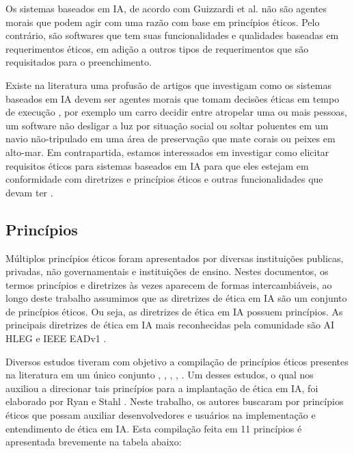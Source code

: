 Os sistemas baseados em \acrshort{IA}, de acordo com Guizzardi et al. \cite{guizzardi2020ethical} não são agentes morais que podem agir com uma razão com base em princípios éticos. Pelo contrário, são softwares que tem suas funcionalidades e qualidades baseadas em requerimentos éticos, em adição a outros tipos de requerimentos que são requisitados para o preenchimento.

Existe na literatura uma profusão de artigos que investigam como os sistemas baseados em IA devem ser agentes morais que tomam decisões éticas em tempo de execução \cite{guizzardi2020ethical}, por exemplo um carro decidir entre atropelar uma ou mais pessoas, um software não desligar a luz por situação social ou soltar poluentes em um navio não-tripulado em uma área de preservação que mate corais ou peixes em alto-mar. Em contrapartida, estamos interessados em investigar como elicitar requisitos éticos para sistemas baseados em IA para que eles estejam em conformidade com diretrizes e princípios éticos e outras funcionalidades que devam ter \cite{guizzardi2020ethical}.
 
\subsection{Princípios}

Múltiplos princípios éticos foram apresentados por diversas instituições publicas, privadas, não governamentais e instituições de ensino. Nestes documentos, os termos princípios e diretrizes às vezes aparecem de formas intercambiáveis, ao longo deste trabalho assumimos que as diretrizes de ética em IA são um conjunto de princípios éticos. Ou seja, as diretrizes de ética em IA possuem princípios. As principais diretrizes de ética em IA mais reconhecidas pela comunidade são \acrshort{AI HLEG}\cite{HLEG_EthicsGuidelinesForTrustworthyAI} e \acrshort{IEEE} \acrshort{EAD}v1 \cite{ieee2020EADv1}.

Diversos estudos tiveram com objetivo a compilação de princípios éticos presentes na literatura em um único conjunto \cite{hagendorff2020ethics}, \cite{jobin2019global}, \cite{Fjeld2020principled}, \cite{Zeng2019LinkingAI}, \cite{koensmit2020areviewofaiprinciples}. Um desses estudos, o qual nos auxiliou a direcionar tais princípios para a implantação de ética em \acrshort{IA}, foi elaborado por Ryan e Stahl \cite{Ryan2020ArtificialIE}. Neste trabalho, os autores buscaram por princípios éticos que possam auxiliar desenvolvedores e usuários na implementação e entendimento de ética em IA. Esta compilação feita em 11 princípios é apresentada brevemente na tabela abaixo:

